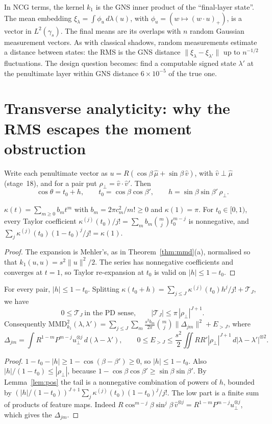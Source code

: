 In NCG terms, the kernel $k_1$ is the GNS inner product of the ``final-layer state''. The mean embedding
$\xi_\lambda=\int\phi_u\,d\lambda(u)$, with $\phi_u=(w\mapsto(w\cdot u)_+)$, is a vector in $L^2(\gamma_s)$. The final means are its overlaps
with $n$ random Gaussian measurement vectors. As with classical shadows, random measurements estimate a
distance between states: the RMS is the GNS distance $\|\xi_\lambda-\xi_{\lambda'}\|$ up to $n^{-1/2}$ fluctuations. The
design question becomes: find a computable signed state $\lambda'$ at the penultimate layer within GNS
distance $6\times10^{-5}$ of the true one.

\section{Transverse analyticity: why the RMS escapes the moment obstruction}
Write each penultimate vector as $u=R(\cos\beta\,\hat\mu+\sin\beta\,\hat v)$, with $\hat v\perp\hat\mu$ (stage~18), and for a pair put
$\rho_\perp=\hat v\cdot\hat v'$. Then
\[
\cos\theta=t_0+h,\qquad t_0=\cos\beta\cos\beta',\qquad h=\sin\beta\sin\beta'\,\rho_\perp .
\]

\begin{lemma}[Positivity]\label{lem:pos}
$\kappa(t)=\sum_{m\ge0}b_mt^m$ with $b_m=2\pi c_m^2/m!\ge0$ and $\kappa(1)=\pi$. For $t_0\in[0,1)$, every Taylor coefficient
$\kappa^{(j)}(t_0)/j!=\sum_mb_m\binom mjt_0^{m-j}$ is nonnegative, and $\sum_j\kappa^{(j)}(t_0)(1-t_0)^j/j!=\kappa(1)$.
\end{lemma}
\begin{proof}
The expansion is Mehler's, as in Theorem~\ref{thm:mmd}(a), normalised so that $k_1(u,u)=s^2\|u\|^2/2$. The series has
nonnegative coefficients and converges at $t=1$, so Taylor re-expansion at $t_0$ is valid on $|h|\le1-t_0$.
\end{proof}

\begin{theorem}\label{thm:analytic}
For every pair, $|h|\le1-t_0$. Splitting $\kappa(t_0+h)=\sum_{j\le J}\kappa^{(j)}(t_0)h^j/j!+\mathcal T_J$, we have
\[
0\le\mathcal T_J\ \text{in the PD sense},\qquad|\mathcal T_J|\le\pi\,|\rho_\perp|^{J+1}.
\]
Consequently
$\mathrm{MMD}^2_{k_1}(\lambda,\lambda')=\sum_{j\le J}\sum_m\frac{s^2b_m}{2\pi}\binom mj\|\Delta_{jm}\|^2+E_{>J}$, where
\[
\Delta_{jm}=\int R^{1-m}P^{m-j}u_\perp^{\otimes j}\,d(\lambda-\lambda'),\qquad
0\le E_{>J}\le\frac{s^2}2\iint RR'|\rho_\perp|^{J+1}\,d|\lambda-\lambda'|^{\otimes2}.
\]
\end{theorem}
\begin{proof}
$1-t_0-|h|\ge1-\cos(\beta-\beta')\ge0$, so $|h|\le1-t_0$. Also $|h|/(1-t_0)\le|\rho_\perp|$, because $1-\cos\beta\cos\beta'\ge\sin\beta\sin\beta'$. By
Lemma~\ref{lem:pos} the tail is a nonnegative combination of powers of $h$, bounded by
$(|h|/(1-t_0))^{J+1}\sum_j\kappa^{(j)}(t_0)(1-t_0)^j/j!$. The low part is a finite sum of products of feature maps. Indeed
$R\cos^{m-j}\beta\sin^j\beta\,\hat v^{\otimes j}=R^{1-m}P^{m-j}u_\perp^{\otimes j}$, which gives the $\Delta_{jm}$.
\end{proof}

